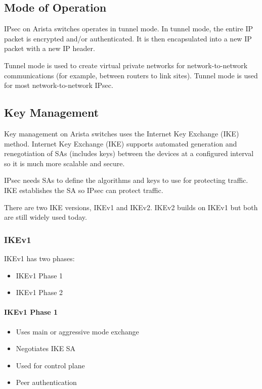 \subsection{Mode of Operation}
  
IPsec on Arista switches operates in tunnel mode. In tunnel mode, the entire IP packet is encrypted and/or authenticated. It is then encapsulated into a new IP packet with a new IP header.
  
Tunnel mode is used to create virtual private networks for network-to-network communications (for example, between routers to link sites). Tunnel mode is used for most network-to-network IPsec.

\subsection{Key Management}
  
Key management on Arista switches uses the Internet Key Exchange (IKE) method. Internet Key Exchange (IKE) supports automated generation and renegotiation of SAs (includes keys) between the devices at a configured interval so it is much more scalable and secure.  

IPsec needs SAs to define the algorithms and keys to use for protecting traffic. IKE establishes the SA so IPsec can protect traffic.
  
There are two IKE versions, IKEv1 and IKEv2. IKEv2 builds on IKEv1 but both are still widely used today.

\newpage

\subsubsection{IKEv1}
IKEv1 has two phases:
\begin{itemize}
    \item IKEv1 Phase 1
    \item IKEv1 Phase 2
\end{itemize}

\paragraph{IKEv1 Phase 1}
\begin{itemize}
    \item Uses main or aggressive mode exchange
    \item Negotiates IKE SA
    \item Used for control plane
    \item Peer authentication
\end{itemize}

